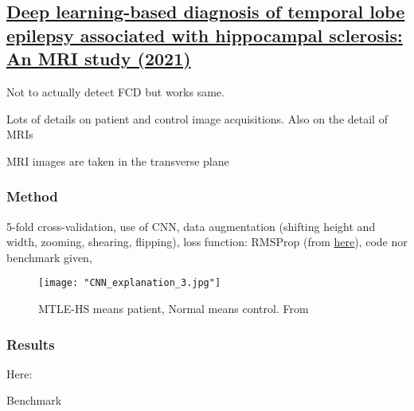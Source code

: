 \subsection{\href{https://www.sciencedirect.com/science/article/pii/S0920121121002709\#sec0010}{Deep learning-based diagnosis of temporal lobe epilepsy associated with hippocampal sclerosis: An MRI study (2021)}}
\label{sub:sec:res6}

Not to actually detect FCD but works same.

Lots of details on patient and control image acquisitions.
Also on the detail of MRIs

MRI images are taken in the transverse plane

\subsubsection{Method}

5-fold cross-validation, 
use of CNN, 
data augmentation (shifting height and width, zooming, shearing, flipping),
loss function: RMSProp (from \href{https://www.sciencedirect.com/science/article/pii/S0920121121002709\#bib21}{here}),
code nor benchmark given,

\begin{figure}[htbp]
	\centering
	\texttt{[image: "CNN\_explanation\_3.jpg"]}
	\caption{MTLE-HS means patient, Normal means control. From }
\end{figure}

\subsubsection{Results}

Here: 

\begin{table}[htbp]
	\centering
	\caption{Benchmark}

	\caption{Results from }
	\label{tab:res6}
\end{table}

